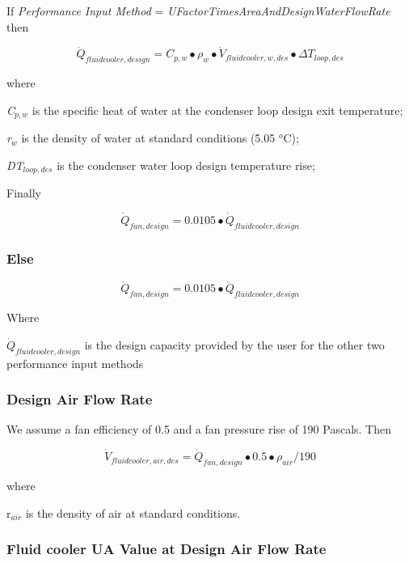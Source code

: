 If \emph{Performance Input Method} = \emph{UFactorTimesAreaAndDesignWaterFlowRate} then

\begin{equation}
{\dot Q_{fluidcooler,design}} = {C_{p,w}} \bullet {\rho_w} \bullet {\dot V_{fluidcooler,w,des}} \bullet \Delta {T_{loop,des}}
\end{equation}

where

\emph{C\(_{p,w}\)} is the specific heat of water at the condenser loop design exit temperature;

\emph{r\(_{w}\)} is the density of water at standard conditions (5.05 \(^{o}\)C);

\emph{DT\(_{loop,des}\)} is the condenser water loop design temperature rise;

Finally

\begin{equation}
{\dot Q_{fan,design}} = 0.0105 \bullet {\dot Q_{fluidcooler,design}}
\end{equation}

\subsubsection{Else}\label{else}

\begin{equation}
{\dot Q_{fan,design}} = 0.0105 \bullet {\dot Q_{fluidcooler,design}}
\end{equation}

Where

\({\dot Q_{fluidcooler,design}}\) is the design capacity provided by the user for the other two performance input methods

\subsubsection{Design Air Flow Rate}\label{design-air-flow-rate-2}

We assume a fan efficiency of 0.5 and a fan pressure rise of 190 Pascals. Then

\begin{equation}
{\dot V_{fluidcooler,air,des}} = {\dot Q_{fan,design}} \bullet 0.5 \bullet {\rho_{air}}/190
\end{equation}

where

r\(_{air}\) is the density of air at standard conditions.

\subsubsection{Fluid cooler UA Value at Design Air Flow Rate}\label{fluid-cooler-ua-value-at-design-air-flow-rate-1}

